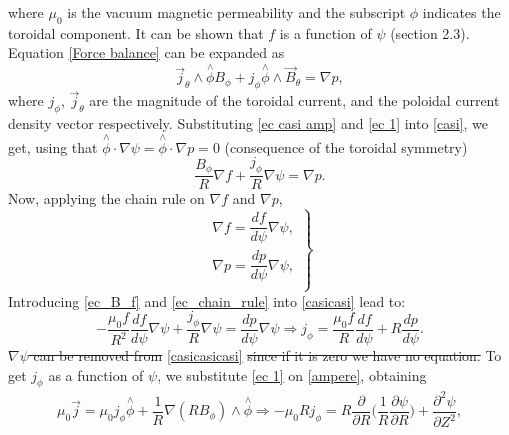 \documentclass[a4paper,12pt,oneside]{book}
\newcommand{\p}{\partial}
\begin{document}
%
where $\mu_0$ is the vacuum magnetic permeability and the subscript $\phi$ indicates the toroidal component. It can be shown that $f$ is a function of $\psi$ \cite{Wesson} (section 2.3). Equation \eqref{Force balance} can be expanded as
%
\begin{equation}\label{casi}
\vec{j}_\theta \wedge \stackrel{\wedge}{\phi} B_\phi+j_\phi \stackrel{\wedge}{\phi} \wedge \vec{B}_\theta=\nabla p,
\end{equation}
%
where $j_\phi$, $\vec{j}_\theta$ are the magnitude of the toroidal current, and the poloidal current density vector respectively. Substituting \eqref{ec casi amp} and \eqref{ec 1} into \eqref{casi}, we get, using that $\stackrel{\wedge}{\phi} \cdot \nabla \psi=\stackrel{\wedge}{\phi} \cdot \nabla p=0$ (consequence of the toroidal symmetry)
%
\begin{equation}\label{casicasi}
\dfrac{B_\phi}{R} \nabla f + \dfrac{j_\phi}{R} \nabla \psi= \nabla p.
\end{equation}
Now, applying the chain rule on $\nabla f$ and $\nabla p$,
%
\begin{equation}\label{ec_chain_rule}
\left.
\begin{array}{c}
\nabla f=\dfrac{d f}{d \psi} \nabla \psi, \\
\nabla p=\dfrac{d p}{d \psi} \nabla \psi, \\
\end{array}
\right\}
\end{equation}
Introducing \eqref{ec_B_f} and \eqref{ec_chain_rule} into \eqref{casicasi} lead to:
%
\begin{equation}\label{casicasicasi}
-\dfrac{\mu_0 f}{R^2} \dfrac{d f}{d \psi} \nabla \psi + \dfrac{j_\phi}{R} \nabla \psi =  \dfrac{d p}{d \psi} \nabla \psi \Rightarrow j_\phi= \dfrac{\mu_0 f}{R} \dfrac{d f}{d \psi} +R\dfrac{d p}{d \psi}.
\end{equation}
\st{$\nabla \psi$ can be removed from} \eqref{casicasicasi} \st{since if it is zero we have no equation.}
To get $j_\phi$ as a function of $\psi$, we substitute \eqref{ec 1} on \eqref{ampere}, obtaining
%
\begin{equation}\label{ec jphi}
\begin{array}{c}
\mu_0 \vec{j}=\mu_0 j_\phi \stackrel{\wedge}{\phi}+\dfrac{1}{R} \nabla(R B_\phi) \wedge \stackrel{\wedge}{\phi} \Rightarrow
-\mu_0 R j_\phi=R \dfrac{\p }{\p R} \Big( \dfrac{1}{R} \dfrac{\p \psi}{\p R} \Big) +\dfrac{\p^2 \psi}{\p Z^2},
\end{array}
\end{equation}
\end{document}

